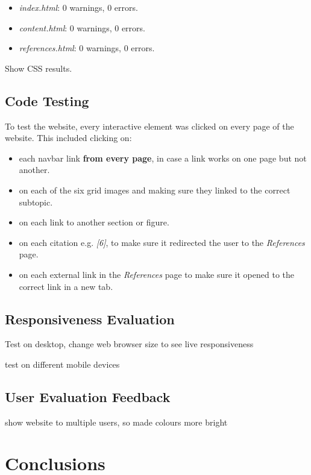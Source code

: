 \documentclass[letterpaper,12pt]{article}
\begin{document}
\begin{itemize}
    \item \textit{index.html}: 0 warnings, 0 errors.
    \item \textit{content.html}: 0 warnings, 0 errors.
    \item \textit{references.html}: 0 warnings, 0 errors.
\end{itemize}

Show CSS results.

\subsection{Code Testing}

To test the website, every interactive element was clicked on every page of the website. This included clicking on:
\begin{itemize}
    \item each navbar link \textbf{from every page}, in case a link works on one page but not another.
    \item on each of the six grid images and making sure they linked to the correct subtopic.
    \item on each link to another section or figure.
    \item on each citation e.g. \textit{[6]}, to make sure it redirected the user to the \textit{References} page.
    \item on each external link in the \textit{References} page to make sure it opened to the correct link in a new tab.
\end{itemize}

\subsection{Responsiveness Evaluation}

Test on desktop, change web browser size to see live responsiveness

test on different mobile devices

\subsection{User Evaluation Feedback}

show website to multiple users, so made colours more bright

\section{Conclusions}
\label{sec:conclusions}
\end{document}
